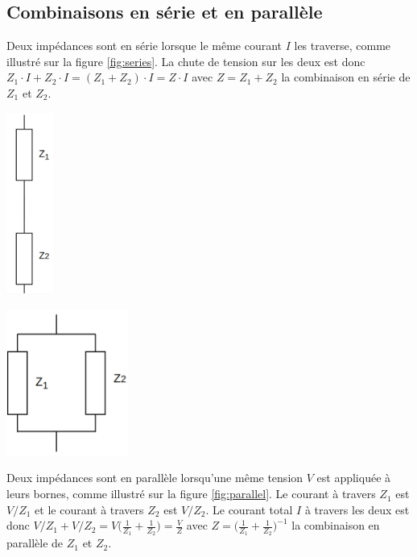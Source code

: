 \subsection{Combinaisons en série et en parallèle}

Deux impédances sont en série lorsque le même courant $I$ les traverse, comme illustré sur la figure \ref{fig:series}. La chute de tension sur les deux est donc $Z_1 \cdot I + Z_2 \cdot I = (Z_1 + Z_2) \cdot I = Z \cdot I$ avec $Z = Z_1 + Z_2$ la combinaison en série de $Z_1$ et $Z_2$.

\begin{minipage}{.5\textwidth}
	\centering
	\includegraphics[height=6cm]{figures/ch00/series.jpg}
	\label{fig:series}
\end{minipage}
\begin{minipage}{.5\textwidth}
	\centering
	\includegraphics[width=4cm]{figures/ch00/parallel.jpg}
	\label{fig:parallel}
\end{minipage}%

Deux impédances sont en parallèle lorsqu'une même tension $V$ est appliquée à leurs bornes, comme illustré sur la figure \ref{fig:parallel}. Le courant à travers $Z_1$ est $V/Z_1$ et le courant à travers $Z_2$ est $V/Z_2$. Le courant total $I$ à travers les deux est donc $V/Z_1 + V/Z_2 = V \big(\frac{1}{Z_1} + \frac{1}{Z_2} \big) = \frac{V}{Z}$ avec $Z = \big(\frac{1}{Z_1} + \frac{1}{Z_2} \big)^{-1}$ la combinaison en parallèle de $Z_1$ et $Z_2$.

